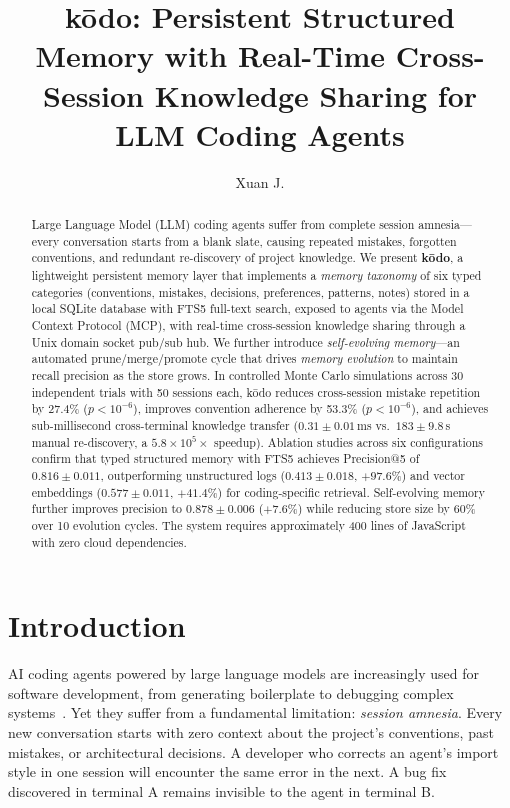 \documentclass{article}
\title{k\=odo: Persistent Structured Memory with Real-Time Cross-Session Knowledge Sharing for LLM Coding Agents}
\author{Xuan J.}
\date{}
\begin{document}
\maketitle

\begin{abstract}
Large Language Model (LLM) coding agents suffer from complete session amnesia---every conversation starts from a blank slate, causing repeated mistakes, forgotten conventions, and redundant re-discovery of project knowledge. We present \textbf{k\=odo}, a lightweight persistent memory layer that implements a \emph{memory taxonomy} of six typed categories (conventions, mistakes, decisions, preferences, patterns, notes) stored in a local SQLite database with FTS5 full-text search, exposed to agents via the Model Context Protocol (MCP), with real-time cross-session knowledge sharing through a Unix domain socket pub/sub hub. We further introduce \emph{self-evolving memory}---an automated prune/merge/promote cycle that drives \emph{memory evolution} to maintain recall precision as the store grows. In controlled Monte Carlo simulations across 30 independent trials with 50 sessions each, k\=odo reduces cross-session mistake repetition by 27.4\% ($p < 10^{-6}$), improves convention adherence by 53.3\% ($p < 10^{-6}$), and achieves sub-millisecond cross-terminal knowledge transfer ($0.31 \pm 0.01$\,ms vs.\ $183 \pm 9.8$\,s manual re-discovery, a $5.8 \times 10^5\times$ speedup). Ablation studies across six configurations confirm that typed structured memory with FTS5 achieves Precision@5 of $0.816 \pm 0.011$, outperforming unstructured logs ($0.413 \pm 0.018$, $+97.6\%$) and vector embeddings ($0.577 \pm 0.011$, $+41.4\%$) for coding-specific retrieval. Self-evolving memory further improves precision to $0.878 \pm 0.006$ ($+7.6\%$) while reducing store size by 60\% over 10 evolution cycles. The system requires approximately 400 lines of JavaScript with zero cloud dependencies.
\end{abstract}

\section{Introduction}

AI coding agents powered by large language models are increasingly used for software development, from generating boilerplate to debugging complex systems~\cite{chen2021codex,li2023starcoder,roziere2023codellama,jimenez2024swebench,yang2024sweagent}. Yet they suffer from a fundamental limitation: \emph{session amnesia}. Every new conversation starts with zero context about the project's conventions, past mistakes, or architectural decisions. A developer who corrects an agent's import style in one session will encounter the same error in the next. A bug fix discovered in terminal A remains invisible to the agent in terminal B.
\end{document}

